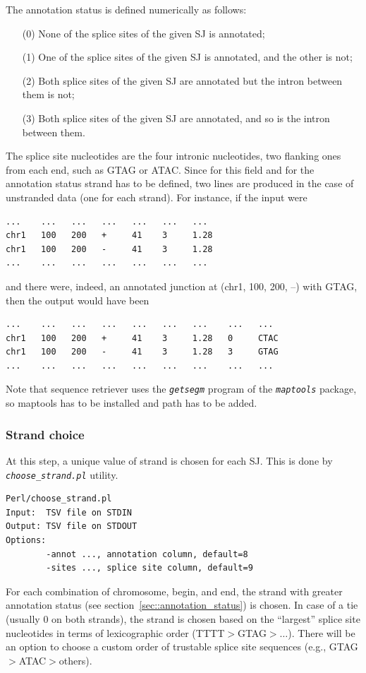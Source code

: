 \documentclass{article}
\newcommand{\prog}[1]{{\tt\em #1}}
\begin{document}
The annotation status is defined numerically as follows:
\begin{enumerate}
\item[(0)] None of the splice sites of the given SJ is annotated;
\item[(1)] One of the splice sites of the given SJ is annotated, and the other is not;
\item[(2)] Both splice sites of the given SJ are annotated but the intron between them is not;
\item[(3)] Both splice sites of the given SJ are annotated, and so is the intron between them.
\end{enumerate}

The splice site nucleotides are the four intronic nucleotides, two flanking ones from each end, such as GTAG or ATAC. Since for this field and for the annotation status strand 
has to be defined, two lines are produced in the case of unstranded data (one for each strand). For instance, if the input were
\begin{verbatim}
...    ...   ...   ...   ...   ...   ...
chr1   100   200   +     41    3     1.28
chr1   100   200   -     41    3     1.28
...    ...   ...   ...   ...   ...   ...
\end{verbatim}
and there were, indeed, an annotated junction at (chr1, 100, 200, --) with GTAG, then the output would have been
\begin{verbatim}
...    ...   ...   ...   ...   ...   ...    ...   ...
chr1   100   200   +     41    3     1.28   0     CTAC
chr1   100   200   -     41    3     1.28   3     GTAG
...    ...   ...   ...   ...   ...   ...    ...   ...
\end{verbatim}

Note that sequence retriever uses the \prog{getsegm} program of the \prog{maptools} package, so maptools has to be installed and path has to be added.


\subsubsection{Strand choice}
At this step, a unique value of strand is chosen for each SJ. This is done by \prog{choose\_strand.pl} utility. 
\begin{verbatim}
Perl/choose_strand.pl
Input:  TSV file on STDIN
Output: TSV file on STDOUT
Options:
        -annot ..., annotation column, default=8
        -sites ..., splice site column, default=9
\end{verbatim}
For each combination of chromosome, begin, and end, the strand with greater annotation status (see section~\ref{sec::annotation_status}) is chosen. In case of 
a tie (usually $0$ on both strands), the strand is chosen based on the ``largest'' splice site nucleotides in terms of lexicographic order (TTTT$>$GTAG$>\dots$).
There will be an option to choose a custom order of trustable splice site sequences (e.g., GTAG$>$ATAC$>$others).
\end{document}

